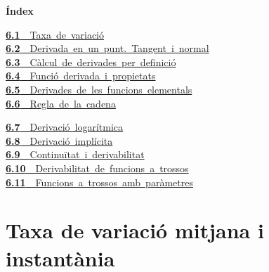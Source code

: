 \documentclass[11pt,a4paper]{article}
\begin{document}
\begin{tcolorbox}[colback=fmsurface,colframe=fmsurface,arc=3mm,left=4mm,right=4mm,top=2mm,bottom=2mm]
\small\textbf{Índex}\par\smallskip
\begin{minipage}[t]{0.49\linewidth}\small \mbox{\hyperlink{sec1}{\textbf{\color{fmgreen}6.1}\ \ Taxa de variació}}\\[3pt]
\mbox{\hyperlink{sec2}{\textbf{\color{fmgreen}6.2}\ \ Derivada en un punt. Tangent i normal}}\\[3pt]
\mbox{\hyperlink{sec3}{\textbf{\color{fmgreen}6.3}\ \ Càlcul de derivades per definició}}\\[3pt]
\mbox{\hyperlink{sec4}{\textbf{\color{fmgreen}6.4}\ \ Funció derivada i propietats}}\\[3pt]
\mbox{\hyperlink{sec5}{\textbf{\color{fmgreen}6.5}\ \ Derivades de les funcions elementals}}\\[3pt]
\mbox{\hyperlink{sec6}{\textbf{\color{fmgreen}6.6}\ \ Regla de la cadena}}\\[3pt]\end{minipage}\hfill\begin{minipage}[t]{0.49\linewidth}\small \mbox{\hyperlink{sec7}{\textbf{\color{fmgreen}6.7}\ \ Derivació logarítmica}}\\[3pt]
\mbox{\hyperlink{sec8}{\textbf{\color{fmgreen}6.8}\ \ Derivació implícita}}\\[3pt]
\mbox{\hyperlink{sec9}{\textbf{\color{fmgreen}6.9}\ \ Continuïtat i derivabilitat}}\\[3pt]
\mbox{\hyperlink{sec10}{\textbf{\color{fmgreen}6.10}\ \ Derivabilitat de funcions a trossos}}\\[3pt]
\mbox{\hyperlink{sec11}{\textbf{\color{fmgreen}6.11}\ \ Funcions a trossos amb paràmetres}}\\[3pt]\end{minipage}
\end{tcolorbox}

\section{Taxa de variació mitjana i instantània}\hypertarget{sec1}{}
\end{document}
